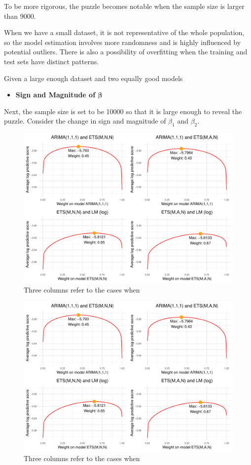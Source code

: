 \documentclass{monashthesis}
\begin{document}
To be more rigorous, the puzzle becomes notable when the sample size is larger than 9000.

When we have a small dataset, it is not representative of the whole population, so the model estimation involves more randomness and is highly influenced by potential outliers. There is also a possibility of overfitting when the training and test sets have distinct patterns.

Given a large enough dataset and two equally good models

\begin{itemize}
\tightlist
\item
  \bf{Sign and Magnitude of $\pmb{\beta}$}
\end{itemize}

Next, the sample size is set to be 10000 so that it is large enough to reveal the puzzle. Consider the change in sign and magnitude of \(\beta_1\) and \(\beta_2\).

\begin{figure}[ht]
\centering
\includegraphics[scale=0.35]{figures/best4.pdf}
\caption{Three columns refer to the cases when }
\label{fig:sign}
\end{figure}

\begin{figure}[ht]
\centering
\includegraphics[scale=0.35]{figures/best4.pdf}
\caption{Three columns refer to the cases when }
\label{fig:magnitude}
\end{figure}
\end{document}
